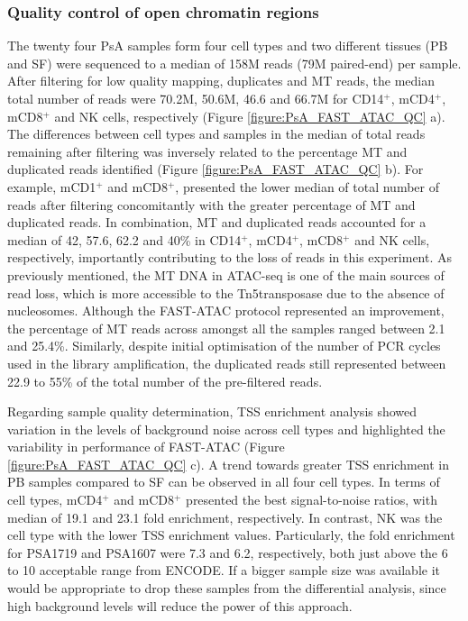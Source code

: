 \subsubsection{Quality control of open chromatin regions}
The twenty four PsA samples form four cell types and two different tissues (PB and SF) were sequenced to a median of 158M reads (79M paired-end) per sample. After filtering for low quality mapping, duplicates and MT reads, the median total number of reads were 70.2M, 50.6M, 46.6 and 66.7M for CD14$^+$, mCD4$^+$, mCD8$^+$ and NK cells, respectively (Figure \ref{figure:PsA_FAST_ATAC_QC} a). The differences between cell types and samples in the median of total reads remaining after filtering was inversely related to the percentage MT and duplicated reads identified (Figure \ref{figure:PsA_FAST_ATAC_QC} b). For example, mCD1$^+$ and mCD8$^+$, presented the lower median of total number of reads after filtering concomitantly with the greater percentage of MT and duplicated reads. In combination, MT and duplicated reads accounted for a median of 42, 57.6, 62.2 and 40\% in CD14$^+$, mCD4$^+$, mCD8$^+$ and NK cells, respectively, importantly contributing to the loss of reads in this experiment. As previously mentioned, the MT DNA in ATAC-seq is one of the main sources of read loss, which is more accessible to the Tn5transposase due to the absence of nucleosomes. Although the FAST-ATAC protocol represented an improvement, the percentage of MT reads across amongst all the samples ranged between 2.1 and 25.4\%. Similarly, despite initial optimisation of the number of PCR cycles used in the library amplification, the duplicated reads still represented between 22.9 to 55\% of the total number of the pre-filtered reads.

Regarding sample quality determination, TSS enrichment analysis showed variation in the levels of background noise across cell types and highlighted the variability in performance of FAST-ATAC (Figure \ref{figure:PsA_FAST_ATAC_QC} c). A trend towards greater TSS enrichment in PB samples compared to SF can be observed in all four cell types. In terms of cell types, mCD4$^+$ and mCD8$^+$ presented the best signal-to-noise ratios, with median of 19.1 and 23.1 fold enrichment, respectively. In contrast, NK was the cell type with the lower TSS enrichment values. Particularly, the fold enrichment for PSA1719 and PSA1607 were 7.3 and 6.2, respectively, both just above the 6 to 10 acceptable range from ENCODE. If a bigger sample size was available it would be appropriate to drop these samples from the differential analysis, since high background levels will reduce the power of this approach. 



